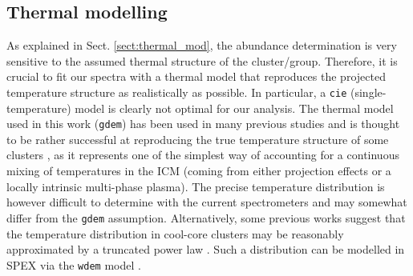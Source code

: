 \documentclass{aa}
\begin{document}
\subsection{Thermal modelling}\label{sect:systematics_GDEM}

As explained in Sect. \ref{sect:thermal_mod}, the abundance determination is very sensitive to the assumed thermal structure of the cluster/group. Therefore, it is crucial to fit our spectra with a thermal model that reproduces the projected temperature structure as realistically as possible. In particular, a \texttt{cie} (single-temperature) model is clearly not optimal for our analysis. The thermal model used in this work (\texttt{gdem}) has been used in many previous studies and is thought to be rather successful at reproducing the true temperature structure of some clusters \citep[e.g.][]{2009A&A...493..409S,2013ApJ...764...46F}, as it represents one of the simplest way of accounting for a continuous mixing of temperatures in the ICM (coming from either projection effects or a locally intrinsic multi-phase plasma). The precise temperature distribution is however difficult to determine with the current spectrometers and may somewhat differ from the \texttt{gdem} assumption. Alternatively, some previous works suggest that the temperature distribution in cool-core clusters may be reasonably approximated by a truncated power law \citep[typically between $0.2 \text{ keV} \lesssim kT \lesssim 3 \text{ keV}$, with more emission towards higher temperatures; see e.g.][]{2004A&A...413..415K,2008MNRAS.385.1186S}. Such a distribution can be modelled in SPEX via the \texttt{wdem} model \citep[for more details, see e.g.][]{2004A&A...413..415K}.
\end{document}
